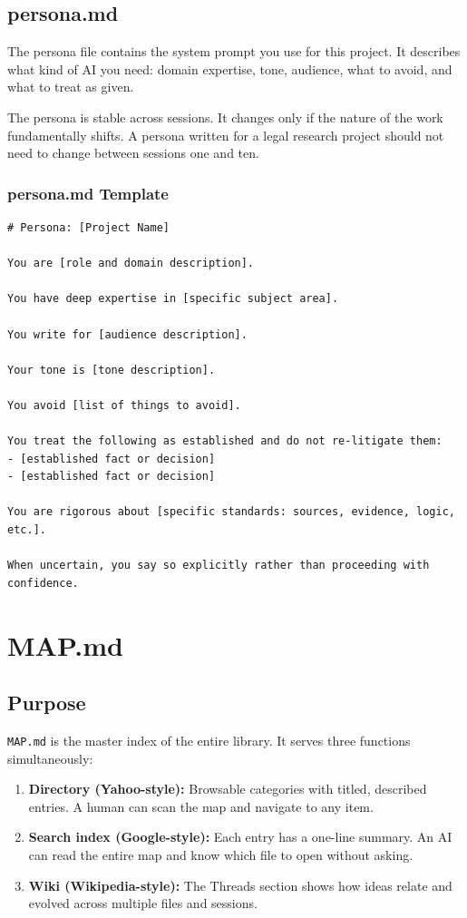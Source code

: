 \documentclass[12pt,letterpaper]{article}
\begin{document}
\subsection{persona.md}

The persona file contains the system prompt you use for this project.
It describes what kind of AI you need: domain expertise, tone, audience,
what to avoid, and what to treat as given.

The persona is stable across sessions. It changes only if the nature of
the work fundamentally shifts. A persona written for a legal research
project should not need to change between sessions one and ten.

\subsubsection{persona.md Template}

\begin{lstlisting}
# Persona: [Project Name]

You are [role and domain description].

You have deep expertise in [specific subject area].

You write for [audience description].

Your tone is [tone description].

You avoid [list of things to avoid].

You treat the following as established and do not re-litigate them:
- [established fact or decision]
- [established fact or decision]

You are rigorous about [specific standards: sources, evidence, logic, etc.].

When uncertain, you say so explicitly rather than proceeding with confidence.
\end{lstlisting}

\section{MAP.md}

\subsection{Purpose}

\texttt{MAP.md} is the master index of the entire library. It serves three
functions simultaneously:

\begin{enumerate}
  \item \textbf{Directory (Yahoo-style):} Browsable categories with titled,
        described entries. A human can scan the map and navigate to any item.
  \item \textbf{Search index (Google-style):} Each entry has a one-line
        summary. An AI can read the entire map and know which file to open
        without asking.
  \item \textbf{Wiki (Wikipedia-style):} The Threads section shows how
        ideas relate and evolved across multiple files and sessions.
\end{enumerate}
\end{document}
